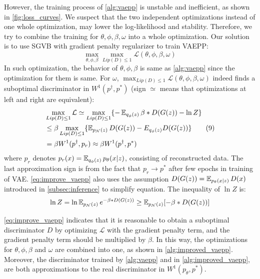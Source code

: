 However, the training process of \cref{alg:vaepp} is unstable and inefficient, as shown in \cref{fig:loss_curves}. 
We suspect that the two independent optimizations instead of one whole optimization, may lower the log-likelihood and stability. Therefore, we try to combine the training for $\theta, \phi, \beta, \omega$ into a whole optimization. 
Our solution is to use SGVB with gradient penalty regularizer to train VAEPP:
\begin{equation*}
	\max_{\theta, \phi, \beta} \max_{Lip(D) \leq 1} \mathcal{L}(\theta, \phi, \beta, \omega) 
\end{equation*} 
In such optimization, the behavior of $\theta, \phi, \beta$ is same as \cref{alg:vaepp} since the optimization for them is same. For $\omega$, 
$\max_{Lip(D) \leq 1} \mathcal{L}(\theta, \phi, \beta, \omega)$ indeed finds a suboptimal discriminator in $W^1(p^\dag, p^*)$ (sign $\simeq$ means that optimizations at left and right are equivalent):
\begin{align*}\label{eq:improve_vaepp}
	&\max_{Lip(D) \leq 1} \mathcal{L} \simeq \max_{Lip(D) \leq 1} \{ -\operatorname{\mathbb{E}}_{q_\phi(z)} \beta*D(G(z)) - \ln Z \}\\ 
	&\leq \beta \max_{Lip(D) \leq 1} \{ \operatorname{\mathbb{E}}_{p_\mathcal{N}(z)} D(G(z)) - E_{q_\phi(z)} D(G(z)) \} \tag{9} \\
	&= \beta W^1(p^\dag, p_r) \approx \beta W^1(p^\dag, p^*) 
\end{align*}
where $p_r$ denotes $p_r(x) = \operatorname{\mathbb{E}}_{q_\phi(z)} p_\theta(x|z)$, consisting of reconstructed data. 
The last approximation sign is from the fact that $p_r \rightarrow p^*$ after  few epochs in training of VAE. \cref{eq:improve_vaepp} also uses the assumption $D(G(z)) = \operatorname{\mathbb{E}}_{p_\theta(x|z)} D(x)$ introduced in \cref{subsec:inference} to simplify equation. The inequality of $\ln Z$ is:
\begin{equation*}
	\ln Z = \ln \operatorname{\mathbb{E}}_{p_\mathcal{N}(z)} e^{- \beta * D(G(z))} \geq \operatorname{\mathbb{E}}_{p_\mathcal{N}(z)} [- \beta * D(G(z))]
\end{equation*}

\cref{eq:improve_vaepp} indicates that it is reasonable to obtain a suboptimal discriminator $D$ by optimizing $\mathcal{L}$ with the gradient penalty term, and the gradient penalty term should be multiplied by $\beta$. In this way, the optimizations for $\theta, \phi, \beta$ and $\omega$ are combined into one, as shown in \cref{alg:improved_vaepp}. 
Moreover, the discriminator trained by \cref{alg:vaepp} and in \cref{alg:improved_vaepp}, are both approximations to the real discriminator in $W^1(p_\theta, p^*)$. 

